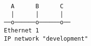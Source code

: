 \documentclass[varwidth,crop]{standalone}
\begin{document}
\begin{verbatim}
  A      B      C
  │      │      │
──o──────o──────o──
Ethernet 1
IP network "development"
\end{verbatim}
\end{document}
